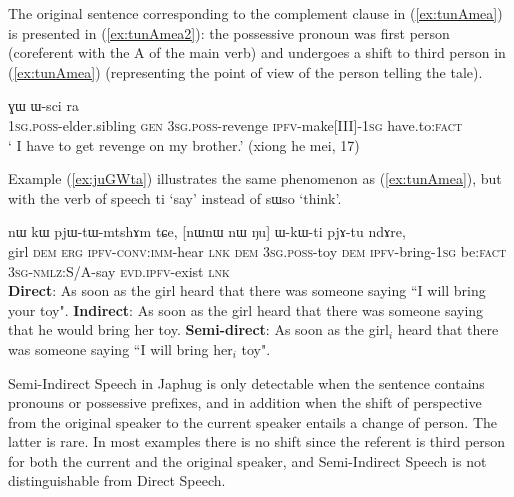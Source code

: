 \documentclass[oldfontcommands,oneside,a4paper,11pt]{article}
\newcommand{\ipa}[1]{{\phon \mbox{#1}}} %
\newcommand{\refb}[1]{(\ref{#1})}
\newcommand{\bleu}[1]{{\color{blue}#1}}
\newcommand{\rouge}[1]{{\color{red}#1}}
\begin{document}
The original sentence corresponding to the complement clause in \refb{ex:tunAmea} is presented in \refb{ex:tunAmea2}: the possessive pronoun was first person (coreferent with the A of the main verb) and undergoes a shift to third person in \refb{ex:tunAmea} (representing the point of view of the person telling the tale).
  \begin{exe}
\ex \label{ex:tunAmea2}
\gll \bleu{\ipa{a-pi}}  	\ipa{ɣɯ}  	\ipa{ɯ-sci}  	\bleu{\ipa{tu-nɤme-a}}  	\ipa{ra}	\\
 {\textsc{1sg.poss}-elder.sibling}  \textsc{gen} \textsc{3sg.poss}-revenge {\textsc{ipfv}-make[III]-\textsc{1sg}} have.to:\textsc{fact}  \\
\glt ` I have to get revenge on my brother.' (xiong he mei, 17)
  \end{exe}
  
  Example \refb{ex:juGWta} illustrates the same phenomenon as \refb{ex:tunAmea}, but with the verb of speech \ipa{ti} `say' instead of \ipa{sɯso} `think'.
 
\begin{exe}
\ex \label{ex:juGWta}
\gll   \ipa{tɤɕime}  	\ipa{nɯ}  	\ipa{kɯ}  	\ipa{pjɯ-tɯ-mtshɤm}  	\ipa{tɕe,}  	[\ipa{nɯnɯ}  \rouge{\ipa{ɯ-kɯmtɕhɯ}}  	\ipa{nɯ}  	\bleu{\ipa{ju-ɣɯt-a}}  	\ipa{ŋu}]  		\ipa{ɯ-kɯ-ti}  	\ipa{pjɤ-tu}  	\ipa{ndɤre,}  \\
girl \textsc{dem} \textsc{erg} \textsc{ipfv-conv:imm}-hear \textsc{lnk} \textsc{dem} {\textsc{3sg.poss}-toy} \textsc{dem} {\textsc{ipfv}-bring-\textsc{1sg}}  be:\textsc{fact} \textsc{3sg-nmlz}:S/A-say \textsc{evd.ipfv}-exist \textsc{lnk} \\
\glt   \textbf{Direct}: As soon as the girl heard that there was someone saying ``\bleu{I will bring your toy}".
\glt   \textbf{Indirect}:  As soon as the girl heard that there was someone saying that \rouge{he would bring her toy}.
\glt   \textbf{Semi-direct}: As soon as the girl$_i$ heard that there was someone saying ``\bleu{I will bring} \rouge{her$_i$ toy}".
  \end{exe}
  
Semi-Indirect Speech in Japhug is only detectable when the sentence contains pronouns or possessive prefixes, and in addition when the shift of perspective from the original speaker to the current speaker entails a change of person. The latter is rare. In most examples there is no shift since the referent is third person for both the current and the original speaker, and Semi-Indirect Speech is not distinguishable from Direct Speech.
\end{document}
